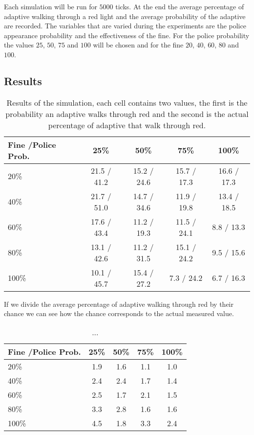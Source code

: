 \documentclass[a4paper]{article}
\begin{document}
Each simulation will be run for $5000$ ticks. At the end the average percentage of adaptive walking through a red light and the average probability of the adaptive are recorded. The variables that are varied during the experiments are the police appearance probability and the effectiveness of the fine. For the police probability the values $25$, $50$, $75$ and $100$ will be chosen and for the fine $20$, $40$, $60$, $80$ and $100$.

\subsection{Results}
\begin{table}[H]
\centering
\begin{tabular}{ l | c c c c }
  Fine \slash Police Prob. & 25\% & 50\% & 75\% & 100\% \\ 
  \hline
  20\%  & 21.5 / 41.2 & 15.2 / 24.6 & 15.7 / 17.3 & 16.6 / 17.3  \\
  40\%  & 21.7 / 51.0 & 14.7 / 34.6 & 11.9 / 19.8 & 13.4 / 18.5  \\
  60\%  & 17.6 / 43.4 & 11.2 / 19.3 & 11.5 / 24.1 &  8.8 / 13.3  \\
  80\%  & 13.1 / 42.6 & 11.2 / 31.5 & 15.1 / 24.2 &  9.5 / 15.6  \\
  100\% & 10.1 / 45.7 & 15.4 / 27.2 &  7.3 / 24.2 &  6.7 / 16.3  \\
\end{tabular}
\caption{Results of the simulation, each cell contains two values, the first is the probability an adaptive walks through red and the second is the actual percentage of adaptive that walk through red.}
\end{table}
If we divide the average percentage of adaptive walking through red by their chance we can see how the chance corresponds to the actual measured value.

\begin{table}[H]
\centering
\begin{tabular}{ l | c c c c }
  Fine \slash Police Prob. & 25\% & 50\% & 75\% & 100\% \\ 
  \hline
  20\%  & 1.9 & 1.6 & 1.1 & 1.0  \\
  40\%  & 2.4 & 2.4 & 1.7 & 1.4  \\
  60\%  & 2.5 & 1.7 & 2.1 & 1.5  \\
  80\%  & 3.3 & 2.8 & 1.6 & 1.6  \\
  100\% & 4.5 & 1.8 & 3.3 & 2.4  \\
\end{tabular}
\caption{... }
\end{table}
\end{document}
